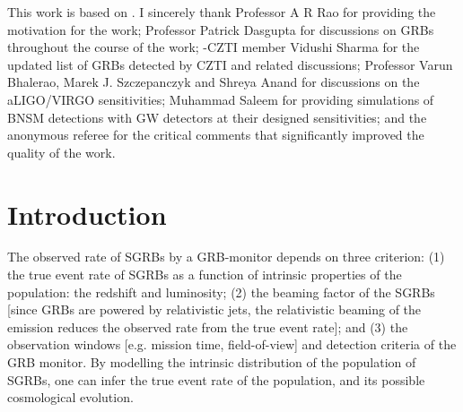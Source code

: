 \begin{checkit}
This work is based on \cite{Paul-2018-MNRAS--short}. I sincerely thank Professor A R Rao for providing the motivation for the work; Professor Patrick Dasgupta for discussions on GRBs throughout the course of the work; \AS -CZTI member Vidushi Sharma for the updated list of GRBs detected by CZTI and related discussions; Professor Varun Bhalerao, Marek J. Szczepanczyk and Shreya Anand for discussions on the aLIGO/VIRGO sensitivities; Muhammad Saleem for providing simulations of BNSM detections with GW detectors at their designed sensitivities; and the anonymous referee for the critical comments that significantly improved the quality of the work.
\end{checkit}



\section{Introduction}
\label{sec:introduction--SGRBs}
The observed rate of SGRBs by a GRB-monitor depends on three criterion: (1) the true event rate of SGRBs as a function of intrinsic properties of the population: the redshift and luminosity; (2) the beaming factor of the SGRBs [since GRBs are powered by relativistic jets, the relativistic beaming of the emission reduces the observed rate from the true event rate]; and (3) the observation windows [e.g. mission time, field-of-view] and detection criteria of the GRB monitor. By modelling the intrinsic distribution of the population of SGRBs, one can infer the true event rate of the population, and its possible cosmological evolution.

